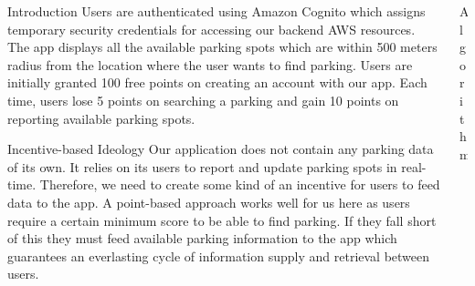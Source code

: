 \documentclass[final]{beamer}
\newlength{\onecolwid}
\newlength{\twocolwid}
\begin{document}
\begin{frame}[t]
\begin{columns}[t]
\begin{column}{\onecolwid}
\begin{block}{Introduction}
Users are authenticated using Amazon Cognito which assigns temporary security credentials for accessing our backend AWS resources. The app displays all the available parking spots which are within 500 meters radius from the location where the user wants to find parking. Users are initially granted 100 free points on creating an account with our app. Each time, users lose 5 points on searching a parking and gain 10 points on reporting available parking spots.
\end{block}

\begin{block}{Incentive-based Ideology}
Our application does not contain any parking data of its own. It relies on its users to report and update parking spots in real-time. Therefore, we need to create some kind of an incentive for users to feed data to the app. A point-based approach works well for us here as users require a certain minimum score to be able to find parking. If they fall short of this they must feed available parking information to the app which guarantees an everlasting cycle of information supply and retrieval between users.
\end{block}

\end{column} %

\begin{column}{\twocolwid} %

\begin{block}{Algorithm}


\end{block}
\end{column}
\end{columns}
\end{frame}
\end{document}
